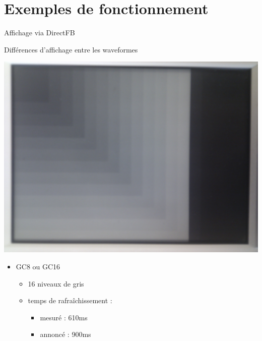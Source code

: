 \section[Exemples]{Exemples de fonctionnement}

\begin{frame}{ Affichage via DirectFB }
	\begin{block} { Différences d'affichage entre les waveformes }
		\parbox{0.3\linewidth}{
			\includegraphics[angle=-90,origin=c,scale=0.04]{gc8_4.jpg}
		}
		\parbox{0.6\linewidth}{
			\begin{itemize}
				\item GC8 ou GC16
				\begin{itemize}
					\item 16 niveaux de gris
					\item temps de rafraîchissement : 
					\begin{itemize}
						\item mesuré  : 610ms
						\item annoncé  : 900ms
					\end{itemize}		
				\end{itemize}
			\end{itemize}
		}
	\end{block}
\end{frame}

